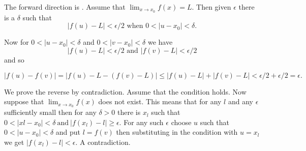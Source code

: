\documentclass[12pt]{article}
\begin{document}
The forward direction is . Assume that $\lim_{x \to x_0}f(x) =
L$. Then given $\epsilon$ there is a $\delta$ such that
\begin{equation*}
  |f(u)- L| < \epsilon/2 \text{ when } 0 < |u-x_0| < \delta.
\end{equation*}

Now for $0 < |u - x_0 | < \delta$ and $ 0< |v- x_0 | < \delta$ we have
\begin{equation*}
   |f(u)- L| < \epsilon/2 \text{ and }  |f(v)-L| < \epsilon/2
\end{equation*}
and so

\begin{equation*}
  |f(u)-f(v)| = | f(u)- L -(f(v)-L)| \leq
  |f(u)-L|+|f(v)-L| < \epsilon/2+\epsilon/2 = \epsilon.
\end{equation*}

We prove the reverse by contradiction.
Assume that the condition holds.
Now suppose  that $\lim_{x \to x_0}f(x)$ does not exist. This means that for
any $l$ 
and any $\epsilon$ sufficiently small then for any $\delta>0$ there is
$x_l$ such that $0<|xl-x_0|< \delta~\text{and}~|f(x_l)-l| \geq \epsilon$.
For any such $\epsilon$ choose $u$ such that $0 < |u-x_0| < \delta $ and
put $l=f(v)$ then substituting in  the condition with $u=x_l$ we get
$|f(x_l)-l| < \epsilon$. A contradiction. 

\end{document}
